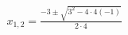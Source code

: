 \documentclass[preview]{standalone}
\begin{document}
\begin{align*}
x_{1,2} = \frac{-3 \pm \sqrt{3^2 - 4 \cdot 4(-1)}}{2 \cdot 4}
\end{align*}
\end{document}
